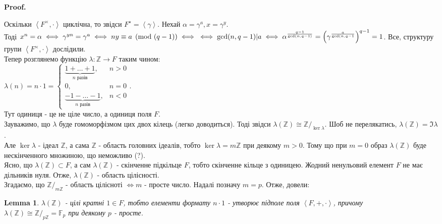 \documentclass[a4paper, 10pt]{article}
\makeatletter
\theoremstyle{theoremdd}
\theoremstyle{theoremdd}
\theoremstyle{theoremdd}
\theoremstyle{theoremdd}
\theoremstyle{theoremdd}
\theoremstyle{theoremdd}
\theoremstyle{theoremdd}
\newtheorem{lemma}[theorem]{Lemma}
\theoremstyle{theoremdd}
\renewenvironment{proof}[1][Proof.\\]{\par
\pushQED{\hfill \qed}%
\normalfont \topsep6\p@\@plus6\p@\relax
\trivlist
\item\relax
{\bfseries
#1\@addpunct{.}}\hspace\labelsep\ignorespaces
}{%
\popQED\endtrivlist\@endpefalse
}
\makeatother
\begin{document}
\begin{proof}
Оскільки $\left< F^\times, \cdot \right>$ циклічна, то звідси $F^\star = \left< \gamma \right>$. Нехай $\alpha = \gamma^a, x = \gamma^y$.\\
Тоді $x^n = \alpha \iff \gamma^{yn} = \gamma^a \iff ny \equiv a \pmod {(q-1)} \iff \\ \iff \gcd(n,q-1) | a \iff \alpha^{\frac{q-1}{\gcd(n,q-1)}} = \left(\gamma^{\frac{a}{\gcd(n,q-1}} \right)^{q-1} = 1$.
\end{proof}
Все, структуру групи $\left< F^\times,\cdot \right>$ дослідили.
\bigskip \\
Тепер розглянемо функцію $\lambda: \mathbb{Z} \to F$ таким чином:\\
$\lambda(n) = n \cdot 1 = \begin{cases} \underbrace{1+\dots+1}_{n\text{ разів}}, & n > 0 \\ 0, & n = 0 \\ \underbrace{-1-\dots-1}_{n\text{ разів}}, & n < 0 \end{cases}$.\\
Тут одиниця - це не ціле число, а одиниця поля $F$.\\
Зауважимо, що $\lambda$ буде гомоморфізмом цих двох кілець (легко доводиться). Тоді звідси $\lambda(\mathbb{Z}) \cong \mathbb{Z}/_{\ker \lambda}$. Шоб не перелякатись, $\lambda(\mathbb{Z}) = \Im \lambda$.\\
Але $\ker \lambda$ - ідеал $\mathbb{Z}$, а сама $\mathbb{Z}$ - область головних ідеалів, тобто $\ker \lambda = m\mathbb{Z}$ при деякому $m > 0$. Тому що при $m = 0$ образ $\lambda(\mathbb{Z})$ буде нескінченного множиною, що неможливо (?).\\
Ясно, що $\lambda(\mathbb{Z}) \subset F$, а сам $\lambda(\mathbb{Z})$ - скінченне підкільце $F$, тобто скінченне кільце з одиницею. Жодний ненульовий елемент $F$ не має дільників нуля. Отже, $\lambda(\mathbb{Z})$ - область цілісності.\\
Згадаємо, що $\mathbb{Z}/_{m\mathbb{Z}}$ - область цілісноті $\iff m$ - просте число. Надалі позначу $m = p$. Отже, довели:

\begin{lemma}
$\lambda(\mathbb{Z})$ - цілі кратні $1 \in F$, тобто елементи формату $n \cdot 1$ - утворює підполе поля $\left< F, +, \cdot \right>$, причому\\
$\lambda(\mathbb{Z}) \cong \mathbb{Z}/_{p \mathbb{Z}} = \mathbb{F}_p$ при деякому $p$ - просте.
\end{lemma}
\end{document}

